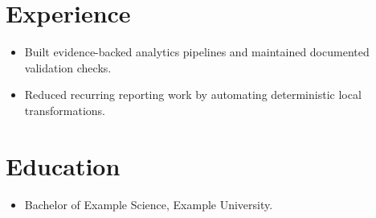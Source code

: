 \documentclass[10pt]{article}
\begin{document}
\section*{Experience}
\begin{itemize}
  \item Built evidence-backed analytics pipelines and maintained documented validation checks.
  \item Reduced recurring reporting work by automating deterministic local transformations.
\end{itemize}
\section*{Education}
\begin{itemize}
  \item Bachelor of Example Science, Example University.
\end{itemize}
\end{document}
